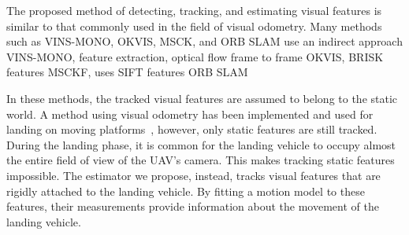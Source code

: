 The proposed method of detecting, tracking, and estimating visual features is
similar to that commonly used in the field of visual odometry. Many methods such
as VINS-MONO, OKVIS, MSCK, and ORB SLAM use an indirect approach
\cite{qin2018vins} VINS-MONO, feature extraction, optical flow frame to frame
\cite{leutenegger2013keyframe} OKVIS, BRISK features
\cite{mourikis2007multi} MSCKF, uses SIFT features
\cite{mur2015orb} ORB SLAM

In these methods, the tracked visual features are assumed to belong to the
static world. A method using visual odometry has been implemented and used for landing on
moving platforms~\cite{falanga2017vision}, however, only static features are
still tracked. During the landing phase, it is common for the landing vehicle
to occupy almost the entire field of view of the UAV's camera. This makes
tracking static features impossible. The estimator we propose, instead, tracks
visual features that are rigidly attached to the landing vehicle. By fitting a
motion model to these features, their measurements provide information about
the movement of the landing vehicle. 

